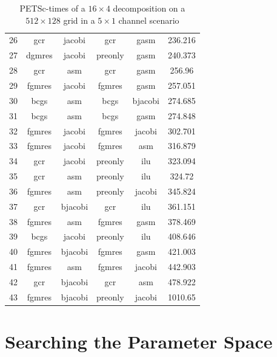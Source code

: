 \begin{table}[h]
\begin{tabular}{cccccc}
    26 & gcr & jacobi & gcr & gasm & 236.216 \\
    27 & dgmres & jacobi & preonly & gasm & 240.373 \\
    28 & gcr & asm & gcr & gasm & 256.96 \\
    29 & fgmres & jacobi & fgmres & gasm & 257.051 \\
    30 & bcgs & asm & bcgs & bjacobi & 274.685 \\
    31 & bcgs & asm & bcgs & gasm & 274.848 \\
    32 & fgmres & jacobi & fgmres & jacobi & 302.701 \\
    33 & fgmres & jacobi & fgmres & asm & 316.879 \\
    34 & gcr & jacobi & preonly & ilu & 323.094 \\
    35 & gcr & asm & preonly & ilu & 324.72 \\
    36 & fgmres & asm & preonly & jacobi & 345.824 \\
    37 & gcr & bjacobi & gcr & ilu & 361.151 \\
    38 & fgmres & asm & fgmres & gasm & 378.469 \\
    39 & bcgs & jacobi & preonly & ilu & 408.646 \\
    40 & fgmres & bjacobi & fgmres & gasm & 421.003 \\
    41 & fgmres & asm & fgmres & jacobi & 442.903 \\
    42 & gcr & bjacobi & gcr & asm & 478.922 \\
    43 & fgmres & bjacobi & preonly & jacobi & 1010.65 \\
    \hline
  \end{tabular}
  \caption{PETSc-times of a $16 \times 4$ decomposition on a $512 \times 128$ grid in a $5 \times 1$ channel scenario}
  \label{fig:petsc-opt-combinations-16x4}
\end{table}

\section{Searching the Parameter Space}

